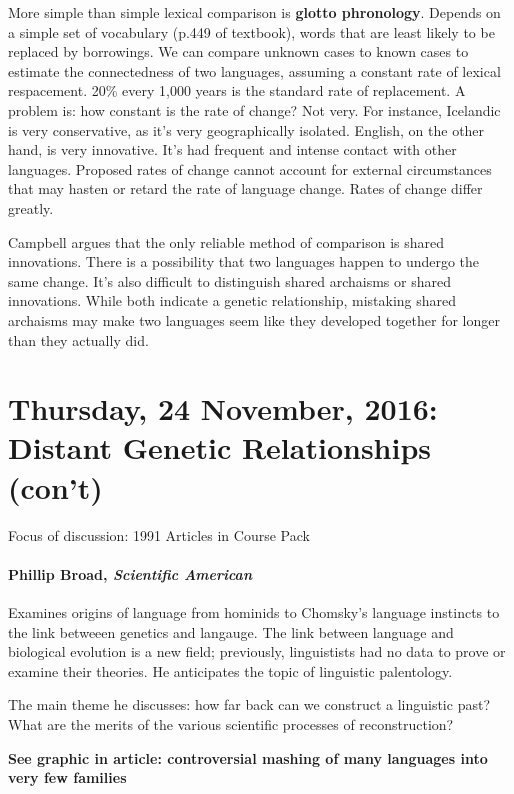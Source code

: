 \documentclass{exam}
\begin{document}
More simple than simple lexical comparison is \textbf{glotto phronology}. 
Depends on a simple set of vocabulary (p.449 of textbook), words that are least likely to be replaced by borrowings. 
We can compare unknown cases to known cases to estimate the connectedness of two languages, assuming a constant rate of lexical respacement. 
20\% every 1,000 years is the standard rate of replacement. 
A problem is: how constant is the rate of change? Not very.
For instance, Icelandic is very conservative, as it's very geographically isolated.
English, on the other hand, is very innovative. 
It's had frequent and intense contact with other languages. 
Proposed rates of change cannot account for external circumstances that may hasten or retard the rate of language change. 
Rates of change differ greatly. 

Campbell argues that the only reliable method of comparison is shared innovations.
There is a possibility that two languages happen to undergo the same change.
It's also difficult to distinguish shared archaisms or shared innovations. 
While both indicate a genetic relationship, mistaking shared archaisms may make two languages seem like they developed together for longer than they actually did.



\section*{Thursday, 24 November, 2016: Distant Genetic Relationships (con't)}

Focus of discussion: 1991 Articles in Course Pack

\paragraph{Phillip Broad, \textit{Scientific American}}
Examines origins of language from hominids to Chomsky's language instincts to the link betweeen genetics and langauge. 
The link between language and biological evolution is a new field; previously, linguistists had no data to prove or examine their theories. 
He anticipates the topic of linguistic palentology. 

The main theme he discusses: how far back can we construct a linguistic past?
What are the merits of the various scientific processes of reconstruction?


\textbf{See graphic in article: controversial mashing of many languages into very few families}
\end{document}
